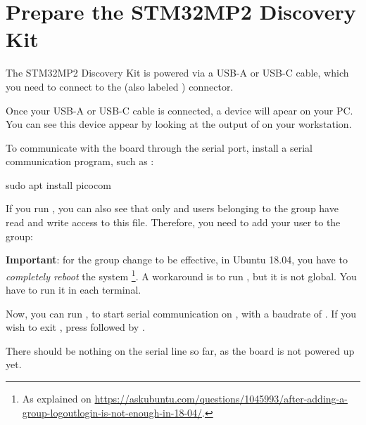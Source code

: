 \section{Prepare the STM32MP2 Discovery Kit}

The STM32MP2 Discovery Kit is powered via a USB-A or USB-C cable,
which you need to connect to the  (also labeled
) connector.

Once your USB-A or USB-C cable is connected, a  device
will apear on your PC. You can see this device appear by looking at
the output of  on your workstation.

To communicate with the board through the serial port, install a
serial communication program, such as :

\begin{bashinput}
sudo apt install picocom
\end{bashinput}

If you run , you can also see that only
 and users belonging to the  group have read
and write access to this file. Therefore, you need to add your user to
the  group:


{\bf Important}: for the group change to be effective, in Ubuntu 18.04, you have to
{\em completely reboot} the system \footnote{As explained on
\url{https://askubuntu.com/questions/1045993/after-adding-a-group-logoutlogin-is-not-enough-in-18-04/}.}.
A workaround is to run , but it is not global.
You have to run it in each terminal.

Now, you can run , to start
serial communication on , with a baudrate of
. If you wish to exit , press
\code{[Ctrl][a]} followed by \code{[Ctrl][x]}.

There should be nothing on the serial line so far, as the board is not
powered up yet.

